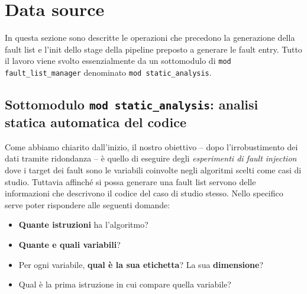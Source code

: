 \newpage
\section{Data source} \label{sec:data_source}
In questa sezione sono descritte le operazioni che precedono la generazione della fault list e l'init dello stage della pipeline preposto a generare le fault entry. Tutto il lavoro viene svolto essenzialmente da un sottomodulo di \texttt{mod fault\_list\_manager} denominato \texttt{mod static\_analysis}.

\subsection{Sottomodulo \texttt{mod static\_analysis}: analisi statica automatica del codice}
Come abbiamo chiarito dall'inizio, il nostro obiettivo -- dopo l'irrobustimento dei dati tramite ridondanza -- è quello di eseguire degli \textit{esperimenti di fault injection} dove i target dei fault sono le variabili coinvolte negli algoritmi scelti come casi di studio. Tuttavia affinché si possa generare una fault list servono delle informazioni che descrivono il codice del caso di studio stesso. Nello specifico serve poter rispondere alle seguenti domande: 
\begin{itemize}
    \itemsep-0.2em
    \item[\ding{52}] \textbf{Quante istruzioni} ha l'algoritmo?
    \item[\ding{52}] \textbf{Quante e quali variabili}?
    \item[\ding{52}] Per ogni variabile, \textbf{qual è la sua etichetta}? La sua \textbf{dimensione}? 
    \item[\ding{52}] Qual è la prima istruzione in cui compare quella variabile? 
\end{itemize}

